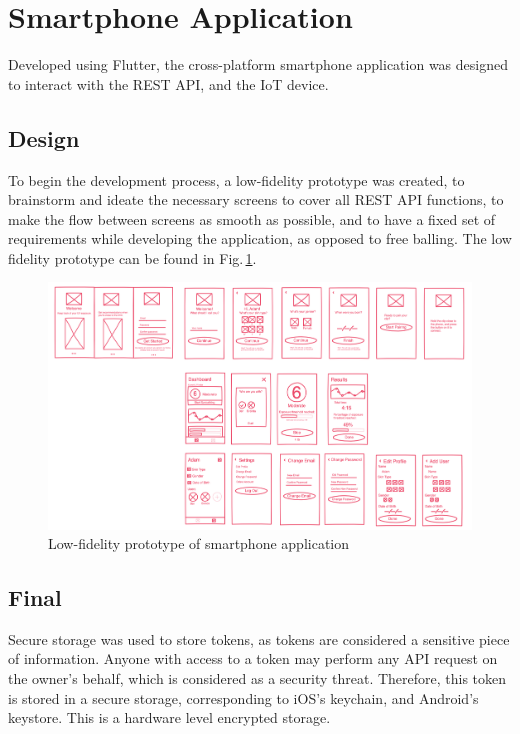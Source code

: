 \documentclass[12pt,openany,a4paper]{book}
\newcommand{\fig}[1]  {Fig.\,\ref{#1}}		%
\newcommand{\app}[1]  {Appendix~\ref{#1}}	%
\begin{document}

\section{Smartphone Application}

Developed using Flutter, the cross-platform smartphone application was designed
to interact with the REST API, and the IoT device.

\subsection{Design}

To begin the development process, a low-fidelity prototype was created, to
brainstorm and ideate the necessary screens to cover all REST API functions,
to make the flow between screens as smooth as possible, and to have a fixed set
of requirements while developing the application, as opposed to free balling.
The low fidelity prototype can be found in \fig{fig:low_fid}.

\begin{figure}[h]
\centering\includegraphics[width=\textwidth]{LowFid.png}
\caption{Low-fidelity prototype of smartphone application}
\label{fig:low_fid}
\end{figure}

\subsection{Final}

Secure storage was used to store tokens, as tokens are considered a sensitive
piece of information. Anyone with access to a token may perform any API request
on the owner's behalf, which is considered as a security threat. Therefore, this
token is stored in a secure storage, corresponding to iOS's keychain, and
Android's keystore. This is a hardware level encrypted storage.
\end{document}
